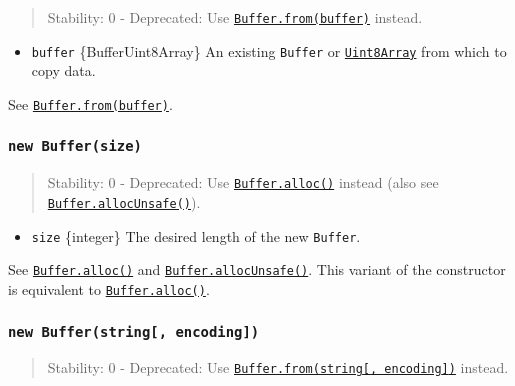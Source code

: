 \begin{quote}
Stability: 0 - Deprecated: Use
\hyperref[static-method-bufferfrombuffer]{\texttt{Buffer.from(buffer)}}
instead.
\end{quote}

\begin{itemize}
\tightlist
\item
  \texttt{buffer} \{Buffer\textbar Uint8Array\} An existing
  \texttt{Buffer} or
  \href{https://developer.mozilla.org/en-US/docs/Web/JavaScript/Reference/Global_Objects/Uint8Array}{\texttt{Uint8Array}}
  from which to copy data.
\end{itemize}

See
\hyperref[static-method-bufferfrombuffer]{\texttt{Buffer.from(buffer)}}.

\subsubsection{\texorpdfstring{\texttt{new\ Buffer(size)}}{new Buffer(size)}}\label{new-buffersize}

\begin{quote}
Stability: 0 - Deprecated: Use
\hyperref[static-method-bufferallocsize-fill-encoding]{\texttt{Buffer.alloc()}}
instead (also see
\hyperref[static-method-bufferallocunsafesize]{\texttt{Buffer.allocUnsafe()}}).
\end{quote}

\begin{itemize}
\tightlist
\item
  \texttt{size} \{integer\} The desired length of the new
  \texttt{Buffer}.
\end{itemize}

See
\hyperref[static-method-bufferallocsize-fill-encoding]{\texttt{Buffer.alloc()}}
and
\hyperref[static-method-bufferallocunsafesize]{\texttt{Buffer.allocUnsafe()}}.
This variant of the constructor is equivalent to
\hyperref[static-method-bufferallocsize-fill-encoding]{\texttt{Buffer.alloc()}}.

\subsubsection{\texorpdfstring{\texttt{new\ Buffer(string{[},\ encoding{]})}}{new Buffer(string{[}, encoding{]})}}\label{new-bufferstring-encoding}

\begin{quote}
Stability: 0 - Deprecated: Use
\hyperref[static-method-bufferfromstring-encoding]{\texttt{Buffer.from(string{[},\ encoding{]})}}
instead.
\end{quote}

